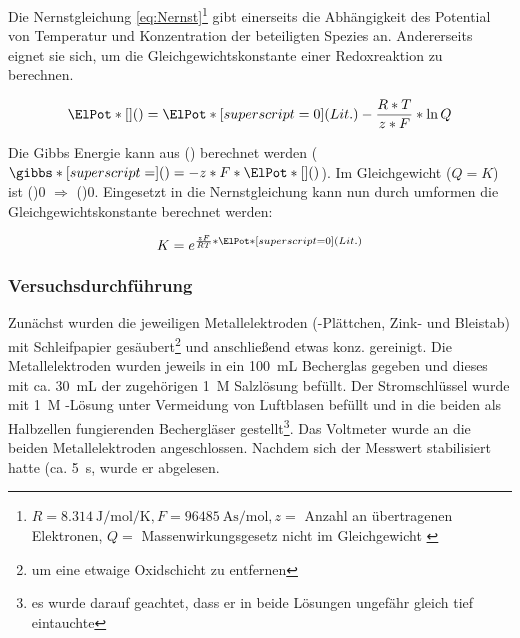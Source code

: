 \documentclass{article}
\begin{document}
      Die Nernstgleichung \eqref{eq:Nernst}\footnote{$R = \SI[mode=text]{8.314}{\joule\per\mole\per\kelvin}, F = \SI[mode=text]{96485}{\ampere\second\per\mole}, z = $ Anzahl an übertragenen Elektronen, $Q = $ Massenwirkungsgesetz nicht im Gleichgewicht \cite{PhysicalChemistryAtkings}} gibt einerseits die Abhängigkeit des Potential von Temperatur und Konzentration der beteiligten Spezies an. Andererseits eignet sie sich, um die Gleichgewichtskonstante einer Redoxreaktion zu berechnen. 
        
      \begin{equation}
        \ElPot*[](){} = \ElPot*[superscript=0](Lit.){} - \frac{R * T}{z * F} * \ln Q \label{eq:Nernst}
      \end{equation}
      
      Die Gibbs Energie kann aus \ElPot*[](){} berechnet werden ($\gibbs*[superscript=](){} = - z * F * \ElPot*[](){}$). Im Gleichgewicht ($Q = K$) ist \gibbs[superscript=](){0} $\Rightarrow$ \ElPot[](){0}. Eingesetzt in die Nernstgleichung kann nun durch umformen die Gleichgewichtskonstante berechnet werden:
      
      \begin{equation}
        K = e^{\frac{z F}{R T} * \ElPot*[superscript=0](Lit.){}} \label{eq:Gleichgewichtskonstante}
      \end{equation}
      
      \subsubsection{Versuchsdurchführung} \label{sec:VersuchZellen}
        
        Zunächst wurden die jeweiligen Metallelektroden (-Plättchen, Zink- und Bleistab) mit Schleifpapier gesäubert\footnote{um eine etwaige Oxidschicht zu entfernen} und anschließend etwas konz.  gereinigt. Die Metallelektroden wurden jeweils in ein \SI[mode=text]{100}{\milli\liter} Becherglas gegeben und dieses mit ca. \SI[mode=text]{30}{\milli\liter} der zugehörigen \SI[mode=text]{1}{M} Salzlösung befüllt. Der Stromschlüssel wurde mit \SI[mode=text]{1}{M} -Lösung unter Vermeidung von Luftblasen befüllt und in die beiden als Halbzellen fungierenden Bechergläser gestellt\footnote{es wurde darauf geachtet, dass er in beide Lösungen ungefähr gleich tief eintauchte}. Das Voltmeter wurde an die beiden Metallelektroden angeschlossen. Nachdem sich der Messwert stabilisiert hatte (ca. \SI[mode=text]{5}{\second}, wurde er abgelesen. 
        
\end{document}
